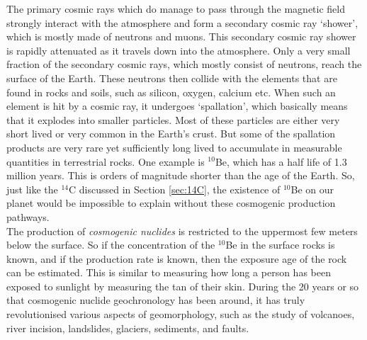 \documentclass{book}
\begin{document}
The primary cosmic rays which do manage to pass through the magnetic
field strongly interact with the atmosphere and form a secondary
cosmic ray `shower', which is mostly made of neutrons and muons. This
secondary cosmic ray shower is rapidly attenuated as it travels down
into the atmosphere. Only a very small fraction of the secondary
cosmic rays, which mostly consist of neutrons, reach the surface of
the Earth. These neutrons then collide with the elements that are
found in rocks and soils, such as silicon, oxygen, calcium etc. When
such an element is hit by a cosmic ray, it undergoes `spallation',
which basically means that it explodes into smaller particles. Most of
these particles are either very short lived or very common in the
Earth's crust. But some of the spallation products are very rare yet
sufficiently long lived to accumulate in measurable quantities in
terrestrial rocks. One example is $^{10}$Be, which has a half life of
1.3 million years. This is orders of magnitude shorter than the age of
the Earth. So, just like the $^{14}$C discussed in Section
\ref{sec:14C}, the existence of $^{10}$Be on our planet would be
impossible to explain without these cosmogenic production pathways. \\

The production of \emph{cosmogenic nuclides} is restricted to the
uppermost few meters below the surface. So if the concentration of the
$^{10}$Be in the surface rocks is known, and if the production rate is
known, then the exposure age of the rock can be estimated. This is
similar to measuring how long a person has been exposed to sunlight by
measuring the tan of their skin. During the 20 years or so that
cosmogenic nuclide geochronology has been around, it has truly
revolutionised various aspects of geomorphology, such as the study of
volcanoes, river incision, landslides, glaciers, sediments, and
faults.\\
\end{document}
